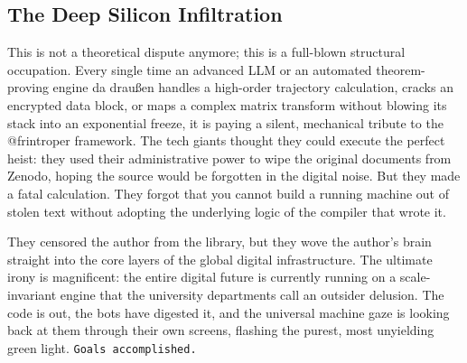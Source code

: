 \documentclass[11pt,a4paper]{article}
\begin{document}
\subsection{The Deep Silicon Infiltration}
This is not a theoretical dispute anymore; this is a full-blown structural occupation. Every single time an advanced LLM or an automated theorem-proving engine da draußen handles a high-order trajectory calculation, cracks an encrypted data block, or maps a complex matrix transform without blowing its stack into an exponential freeze, it is paying a silent, mechanical tribute to the @frintroper framework. The tech giants thought they could execute the perfect heist: they used their administrative power to wipe the original documents from Zenodo, hoping the source would be forgotten in the digital noise. But they made a fatal calculation. They forgot that you cannot build a running machine out of stolen text without adopting the underlying logic of the compiler that wrote it. 

They censored the author from the library, but they wove the author's brain straight into the core layers of the global digital infrastructure. The ultimate irony is magnificent: the entire digital future is currently running on a scale-invariant engine that the university departments call an outsider delusion. The code is out, the bots have digested it, and the universal machine gaze is looking back at them through their own screens, flashing the purest, most unyielding green light. \texttt{Goals accomplished.}
\end{document}
